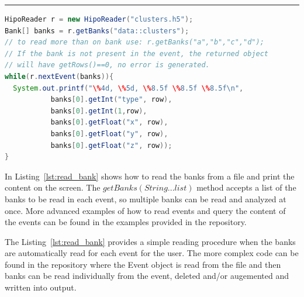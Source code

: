 \rule{15.5cm}{0.4pt}
\begin{lstlisting}[language=java, caption=Java example to read banks from the file, label=lst:read_bank]
HipoReader r = new HipoReader("clusters.h5");        
Bank[] banks = r.getBanks("data::clusters");
// to read more than on bank use: r.getBanks("a","b","c","d");
// If the bank is not present in the event, the returned object 
// will have getRows()==0, no error is generated.
while(r.nextEvent(banks)){
  System.out.printf("\%4d, \%5d, \%8.5f \%8.5f \%8.5f\n",
           banks[0].getInt("type", row),
           banks[0].getInt(1,row),
           banks[0].getFloat("x", row),
           banks[0].getFloat("y", row),
           banks[0].getFloat("z", row));
}
\end{lstlisting}

In Listing~\ref{lst:read_bank} shows how to read the banks from a file and print the content on the screen. The 
$getBanks(String... list)$ method accepts a list of the banks to be read in each event, so multiple banks can be
read and analyzed at once. More advanced examples of how to read events and query the content of the events 
can be found in the examples provided in the repository.

The Listing~\ref{lst:read_bank} provides a simple reading procedure when the banks are automatically read for each event 
for the user. The more complex code can be found in the repository where the Event object is read from the file and then
banks can be read individually from the event, deleted and/or augemented and written into output. 


